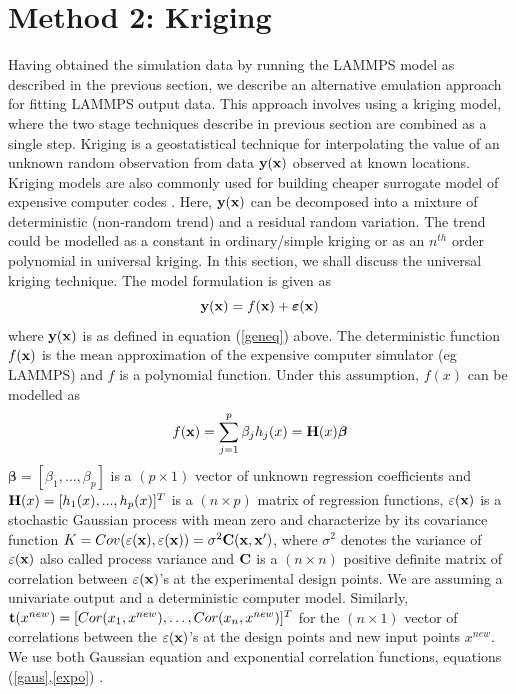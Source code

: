 \documentclass[12pt,titlepage]{report}
\newcommand{\bt}{{\bf t}}
\newcommand{\bH}{{\bf H}}
\newcommand{\bC}{{\bf C}}
\newcommand{\bx}{{\bf x}}
\newcommand{\by}{{\bf y}}
\newcommand{\bbeta}{{\boldsymbol{\beta}}}
\newcommand{\balpha}{{\boldsymbol{\alpha}}}
\theoremstyle{definition}
\theoremstyle{remark}
\begin{document}
\chapter{Method 2: Kriging}
Having obtained the simulation data by running the LAMMPS model as described in the previous section, we describe an alternative emulation approach for fitting LAMMPS output data. This approach involves using a kriging model, where the two stage techniques describe in previous section are combined as a single step. Kriging is a geostatistical technique for interpolating the value of an unknown random observation from data $\by(\bx)$ observed at known locations. Kriging models are also commonly used for building cheaper surrogate model of expensive computer codes \cite{pd1,pd2, pd3,pd6}. Here, $\by(\bx)$ can be decomposed into a mixture of deterministic (non-random trend) and a residual random variation. The trend could be modelled as a constant in ordinary/simple kriging or as an $n^{th}$ order polynomial in universal kriging. In this section, we shall discuss the universal kriging technique. The model formulation is given as
\begin{equation}\label{geneq2}
\by(\bx)= f(\bx) + \boldsymbol \varepsilon(\bx)
\end{equation}
where $\by(\bx)$ is as defined in equation (\ref{geneq}) above. The deterministic function $f(\bx)$ is the mean approximation of the expensive computer simulator (eg LAMMPS) and $f$ is a polynomial function. Under this assumption, $f(x)$ can be modelled as
\begin{equation}
f(\bx) = \sum_{j=1}^{p} \beta_j h_j(x) =\bH(x) \bbeta
\end{equation}
$\bbeta=[\beta_1,\ldots,\beta_p]$ is a $(p\times 1)$ vector of unknown regression coefficients and $\bH(x) = [h_1(x), . . . , h_p(x)]^T$ is a $(n\times p)$ matrix of regression functions,
$\varepsilon(\bx)$ is a stochastic Gaussian process with mean zero and characterize by its covariance function
$K=Cov(\varepsilon(\bx),\varepsilon(\bx)) = \sigma^2\bC(\bx,\bx')$, where $\sigma^2$ denotes the variance of $\varepsilon(\bx)$ also called process variance and $\bC$ is a $(n\times n)$ positive definite matrix of correlation between $\varepsilon(\bx)$'s at the experimental design points. We are assuming a univariate output and a deterministic computer model.
Similarly, $\bt(x^{new}) = [Cor(x_1, x^{new}), \ldots,Cor(x_n, x^{new})]^T$ for the $(n\times 1)$ vector of correlations between the $\varepsilon(\bx)$'s at the design points and new input points $x^{new}$. We use both Gaussian equation and exponential correlation functions, equations (\ref{gaus},\ref{expo}) \citet{pd4,pd18,pd19}.
\end{document}
